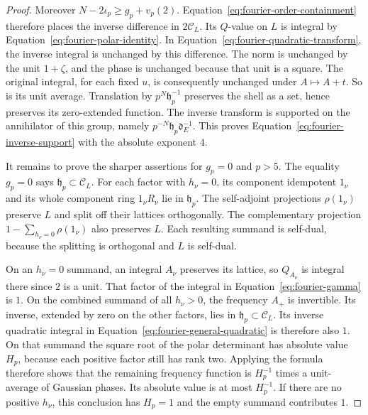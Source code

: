 \begin{proof}
Moreover $N-2\iota_p\ge g_p+v_p(2)$.  Equation~\eqref{eq:fourier-order-containment}
therefore places the inverse difference in $2\mathcal C_L$.  Its $Q$-value
on $L$ is integral by Equation~\eqref{eq:fourier-polar-identity}.
In Equation~\eqref{eq:fourier-quadratic-transform}, the inverse integral is
unchanged by this difference.  The norm is unchanged by the unit $1+\zeta$,
and the phase is unchanged because that unit is a square.  The original
integral, for each fixed $u$, is consequently unchanged under $A\mapsto A+t$.
So is its unit average.  Translation by $p^N\mathfrak h_p^{-1}$ preserves
the shell as a set, hence preserves its zero-extended function.  The inverse
transform is supported on the annihilator of this group, namely
$p^{-N}\mathfrak h_p\mathfrak d_E^{-1}$.  This proves
Equation~\eqref{eq:fourier-inverse-support} with the absolute exponent $4$.

It remains to prove the sharper assertions for $g_p=0$ and $p>5$.  The
equality $g_p=0$ says $\mathfrak h_p\subset\mathcal C_L$.  For each factor
with $h_\nu=0$, its component idempotent $1_\nu$ and its whole component
ring $1_\nu R_\nu$ lie in $\mathfrak h_p$.  The self-adjoint projections
$\rho(1_\nu)$ preserve $L$ and split off their lattices orthogonally.
The complementary projection $1-\sum_{h_\nu=0}\rho(1_\nu)$ also preserves
$L$.  Each resulting summand is self-dual, because the splitting is
orthogonal and $L$ is self-dual.

On an $h_\nu=0$ summand, an integral $A_\nu$ preserves its lattice, so
$Q_{A_\nu}$ is integral there since $2$ is a unit.  That factor of the
integral in Equation~\eqref{eq:fourier-gamma} is $1$.  On the combined
summand of all $h_\nu>0$, the frequency $A_+$ is invertible.  Its inverse,
extended by zero on the other factors, lies in
$\mathfrak h_p\subset\mathcal C_L$.  Its inverse quadratic integral in
Equation~\eqref{eq:fourier-general-quadratic} is therefore also $1$.
On that summand the square root of the polar determinant has absolute value
$H_p$, because each positive factor still has rank two.  Applying the formula
therefore shows that the remaining frequency function is $H_p^{-1}$ times a
unit-average of Gaussian phases.  Its absolute value is at most $H_p^{-1}$.
If there are no positive
$h_\nu$, this conclusion has $H_p=1$ and the empty summand contributes $1$.


\end{proof}

